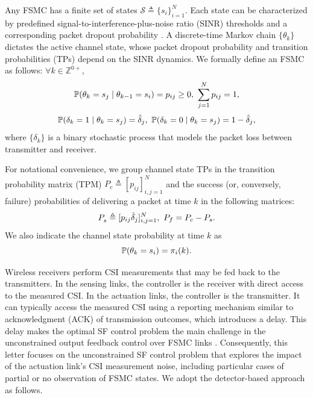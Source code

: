 \documentclass[journal,twoside,web]{ieeecolor}
\begin{document}
Any FSMC has a finite set of states $\mathcal{S}\triangleq\{s_i\}_{i=1}^{N}$. Each state can be characterized by predefined signal-to-interference-plus-noise ratio (SINR) thresholds and a corresponding packet dropout probability \cite{zacchialun2024access}. A discrete-time Markov chain $\{\theta_k\}$ dictates the active channel state, whose packet dropout probability and transition probabilities (TPs) depend on the SINR dynamics. We formally define an FSMC as follows: $\forall k\in \mathbb{Z}^{0+}$,
\begin{equation}\label{eq:p-ij}
    \text{\small $\mathbb{P}(\theta_{k} = s_j \mid \theta_{k-1} = s_i) = p_{ij} \geq 0,~ \sum_{j=1}^N p_{ij} = 1,$}
\end{equation}
\begin{equation}\label{eq:p-delta}
    \text{\small $\mathbb{P}(\delta_k = 1 \mid \theta_{k} = s_j) = \hat{\delta}_{j},~
    \mathbb{P}(\delta_k = 0 \mid \theta_{k} = s_j) = 1 - \hat{\delta}_{j},$}
\end{equation}
where $\{\delta_k\}$ is a binary stochastic process that models the packet loss between transmitter and receiver.

For notational convenience, we group
channel state TPs in the transition probability matrix (TPM) $P_{c}^{} \triangleq [p_{ij}]_{i,j=1}^{N}$
and the  success (or, conversely, failure) probabilities of delivering a packet at time $k$ in the following matrices:
\begin{equation}\label{eq:Ps}
    \text{\small $P_{s}^{} \triangleq [p_{ij}\hat{\delta}_{j}]_{i,j=1}^{N},~P_{f} = P_{c} - P_{s}.$}
\end{equation}
We also indicate the channel state probability at time $k$ as
\begin{equation}\label{eq:pik}
     \text{\small $\mathbb{P}(\theta_{k} = s_i) = \pi_{i}(k).$}
\end{equation}

Wireless receivers perform CSI measurements that may be fed back to the transmitters. In the sensing links, the controller is the receiver with direct access to the measured CSI. In the actuation links, the controller is the transmitter. It can typically access the measured CSI using a reporting mechanism similar to acknowledgment (ACK) of transmission outcomes, which introduces a delay. This delay makes the optimal SF control problem the main challenge in the unconstrained output feedback control over FSMC links \cite{impicciatore2024tac}. Consequently, this letter focuses on the unconstrained SF control problem that explores the impact of the actuation link's CSI measurement noise, including particular cases of partial or no observation of FSMC states. We adopt the detector-based approach as follows.
\end{document}
